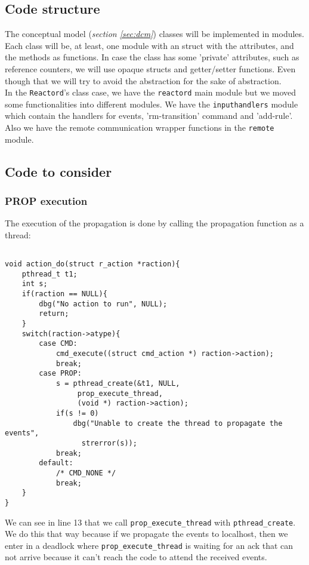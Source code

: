 \subsection{Code structure}
The conceptual model (\emph{section \ref{sec:dcm}}) classes will be implemented in modules. Each class will be, at least, one module with
an struct with the attributes, and the methods as functions. In case the class has some 'private' attributes, such as reference counters,
we will use opaque structs and getter/setter functions. Even though that we will try to avoid the abstraction for the sake of 
abstraction.\\
In the \texttt{Reactord}'s class case, we have the \texttt{reactord} main module but we moved some
functionalities into different modules. We have the \texttt{inputhandlers} module which contain the handlers for events, 'rm-transition'
command and 'add-rule'. Also we have the remote communication wrapper functions in the \texttt{remote} module.
\subsection{Code to consider}
\subsubsection{PROP execution}
The execution of the propagation is done by calling the propagation function as a thread:
\begin{verbatim}

void action_do(struct r_action *raction){
    pthread_t t1;
    int s;
    if(raction == NULL){
        dbg("No action to run", NULL);
        return;
    }
    switch(raction->atype){
        case CMD:
            cmd_execute((struct cmd_action *) raction->action);
            break;
        case PROP:
            s = pthread_create(&t1, NULL, 
                 prop_execute_thread, 
                 (void *) raction->action);
            if(s != 0)
                dbg("Unable to create the thread to propagate the events", 
                  strerror(s));
            break;
        default:
            /* CMD_NONE */
            break;
    }
}
\end{verbatim}
We can see in line 13 that we call \texttt{prop\_execute\_thread} with \texttt{pthread\_create}. We do this that way because if we
propagate the events to localhost, then we enter in a deadlock where \texttt{prop\_execute\_thread} is waiting for an ack that can not 
arrive because it can't reach the code to attend the received events.
